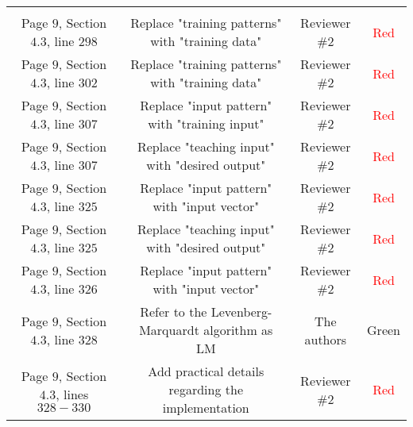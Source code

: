 \documentclass[longtitle]{elsarticle}
\theoremstyle{theorem}
\theoremstyle{definition}
\theoremstyle{remark}
\theoremstyle{proposition}
\numberwithin{figure}{section}
\begin{document}
\begin{longtable}{c|c|c|c}
		\multicolumn{1}{c|}{} &
		\multicolumn{1}{c|}{} \\[0.1cm]
		\cline{1-4}
		\multicolumn{1}{|c|}{Page $9$, Section $4.3$, line $298$} & 
		\multicolumn{1}{c|}{Replace "training patterns" with "training data"} &
		\multicolumn{1}{c|}{Reviewer \#2} &
		\multicolumn{1}{c|}{\textcolor{red}{Red}} \\
		\cline{1-4}
		\multicolumn{1}{|c|}{Page $9$, Section $4.3$, line $302$} & 
		\multicolumn{1}{c|}{Replace "training patterns" with "training data"} &
		\multicolumn{1}{c|}{Reviewer \#2} &
		\multicolumn{1}{c|}{\textcolor{red}{Red}} \\
		\cline{1-4}
		\multicolumn{1}{|c|}{Page $9$, Section $4.3$, line $307$} & 
		\multicolumn{1}{c|}{Replace "input pattern" with "training input"} &
		\multicolumn{1}{c|}{Reviewer \#2} &
		\multicolumn{1}{c|}{\textcolor{red}{Red}} \\
		\cline{1-4}
		\multicolumn{1}{|c|}{Page $9$, Section $4.3$, line $307$} & 
		\multicolumn{1}{c|}{Replace "teaching input" with "desired output"} &
		\multicolumn{1}{c|}{Reviewer \#2} &
		\multicolumn{1}{c|}{\textcolor{red}{Red}} \\
		\cline{1-4}
		\multicolumn{1}{|c|}{Page $9$, Section $4.3$, line $325$} & 
		\multicolumn{1}{c|}{Replace "input pattern" with "input vector"} &
		\multicolumn{1}{c|}{Reviewer \#2} &
		\multicolumn{1}{c|}{\textcolor{red}{Red}} \\
		\cline{1-4}
		\multicolumn{1}{|c|}{Page $9$, Section $4.3$, line $325$} & 
		\multicolumn{1}{c|}{Replace "teaching input" with "desired output"} &
		\multicolumn{1}{c|}{Reviewer \#2} &
		\multicolumn{1}{c|}{\textcolor{red}{Red}} \\
		\cline{1-4}
		\multicolumn{1}{|c|}{Page $9$, Section $4.3$, line $326$} & 
		\multicolumn{1}{c|}{Replace "input pattern" with "input vector"} &
		\multicolumn{1}{c|}{Reviewer \#2} &
		\multicolumn{1}{c|}{\textcolor{red}{Red}} \\
		\cline{1-4}
		\multicolumn{1}{|c|}{Page $9$, Section $4.3$, line $328$} & 
		\multicolumn{1}{c|}{Refer to the Levenberg-Marquardt algorithm as LM} &
		\multicolumn{1}{c|}{The authors} &
		\multicolumn{1}{c|}{\textcolor{deepgreen}{Green}} \\
		\cline{1-4}
		\multicolumn{1}{|c|}{\multirow{2}{*}{Page $9$, Section $4.3$, lines $328-330$}} & 
		\multicolumn{1}{c|}{Add practical details regarding the implementation} &
		\multicolumn{1}{c|}{\multirow{2}{*}{Reviewer \#2}} &
		\multicolumn{1}{c|}{\multirow{2}{*}{\textcolor{red}{Red}}} \\[-0.1cm]

\end{longtable}
\end{document}
